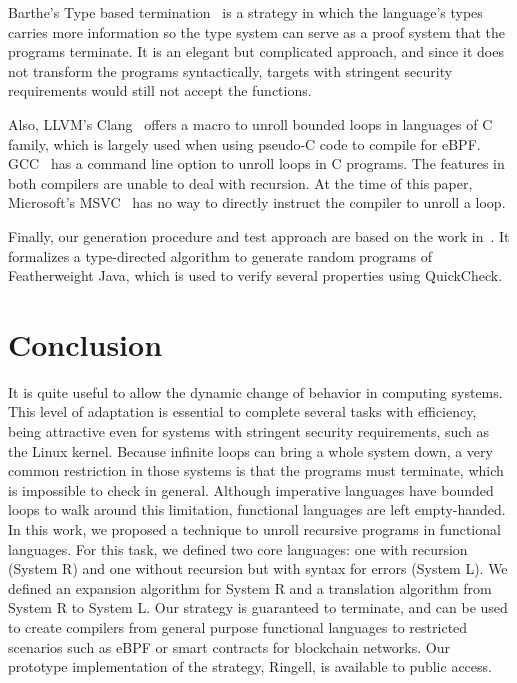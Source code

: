 \documentclass[runningheads]{llncs}
\begin{document}
Barthe's Type based termination~\cite{barthe04,gilletut08,barthe08} 
is a strategy in which the language's types carries more 
information so the type system can serve as a proof 
system that the programs terminate. It is an elegant 
but complicated approach, and since it does not 
transform the programs syntactically, targets with stringent security 
requirements would still not accept the functions.

Also, LLVM's Clang~\cite{clang} offers a macro to unroll 
bounded loops in languages of C family, which is largely 
used when using pseudo-C code to compile for eBPF. 
GCC~\cite{gcc} has a command line option to unroll loops 
in C programs. The features in both compilers are unable 
to deal with recursion. At the time of this paper, 
Microsoft's MSVC~\cite{msvc} has no way to directly 
instruct the compiler to unroll a loop.

Finally, our generation procedure and test approach are 
based on the work in~\cite{feitosa2020type}. It formalizes a 
type-directed algorithm to generate random programs of 
Featherweight Java, which is used to verify several 
properties using QuickCheck.

\section{Conclusion}
It is quite useful to allow the dynamic change of behavior in
computing systems. This level of adaptation is essential to 
complete several tasks with efficiency, being attractive 
even for systems with stringent security requirements, such as the Linux kernel. 
Because infinite loops can bring a whole 
system down, a very common restriction in those
systems is that the 
programs must terminate, which is impossible to check in general. 
Although imperative languages have bounded loops to walk around 
this limitation, functional languages are left empty-handed.
In this work, we proposed a 
technique to unroll recursive programs in functional languages. For 
this task, we defined two core languages: one with recursion (System R) 
and one without recursion but with syntax for errors (System L). 
We defined an expansion algorithm for System R and a translation 
algorithm from System R to System L. Our strategy is guaranteed to 
terminate, and can be used to create 
compilers from general purpose functional languages to restricted 
scenarios such as eBPF or smart contracts for blockchain networks.
Our prototype implementation of the strategy, Ringell, 
is available to public access.



\end{document}
